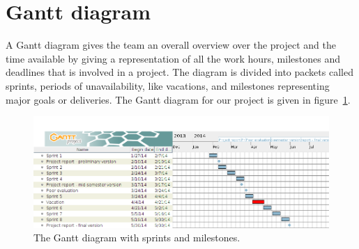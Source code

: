 \section{Gantt diagram}
\label{sec:gantt}

A Gantt diagram gives the team an overall overview over the project and the time available by giving a representation of all the work hours, milestones and deadlines that is involved in a project. The diagram is divided into packets called sprints, periods of unavailability, like vacations, and milestones representing major goals or deliveries.
The Gantt diagram for our project is given in figure~\ref{fig:gantt}.


\begin{figure}[H]
\includegraphics[width=\textwidth]{ch/prestudy/fig/gantt.png}
\caption{The Gantt diagram with sprints and milestones.}
\label{fig:gantt}
\end{figure}
